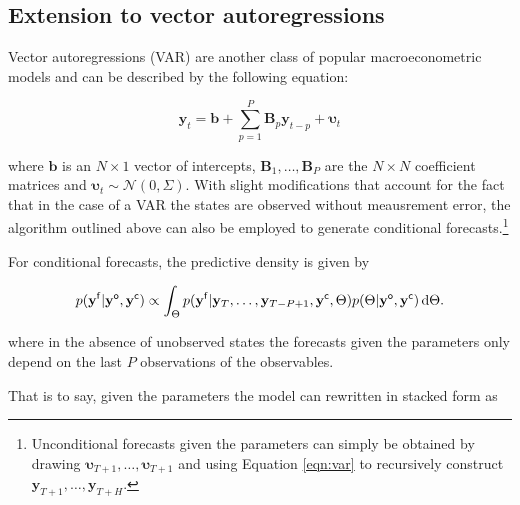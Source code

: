 \documentclass[notitlepage,a4paper,12pt]{article}
\begin{document}
\begin{ThreePartTable}
\pagebreak
\section{Extension to vector autoregressions}

Vector autoregressions (VAR) are another class of popular macroeconometric models and can be described by the following equation: 

\begin{equation}\label{eqn:var}
    \mathbf{y}_t = \mathbf{b} + \sum_{p=1}^P \mathbf{B}_p \mathbf{y}_{t-p} + \boldsymbol{\upsilon}_t
\end{equation}

where $\mathbf{b}$ is an $N \times 1$ vector of intercepts, $\mathbf{B}_1, \dots, \mathbf{B}_P$ are the $N \times N$ coefficient matrices and $\boldsymbol{\upsilon}_t \sim \mathcal{N}(0, \Sigma)$. With slight modifications that account for the fact that in the case of a VAR the states are observed without meausrement error, the algorithm outlined above can also be employed to generate conditional forecasts.\footnote{Unconditional forecasts given the parameters can simply be obtained by drawing $\boldsymbol{\upsilon}_{T+1}, \dots, \boldsymbol{\upsilon}_{T+1}$ and using Equation \ref{eqn:var} to recursively construct $\mathbf{y}_{T+1}, \dots, \mathbf{y}_{T+H}$.}

For conditional forecasts, the predictive density is given by 

\begin{equation}\label{eqn:preddens}    
    p(\mathbf{y^{\sf{f}}}|\mathbf{y^{\sf{o}}}, \mathbf{y^{\sf{c}}}) \propto \int_{\Theta} p(\mathbf{y^{\sf{f}}}|\mathbf{y}_T, \dots, \mathbf{y}_{T-P+1}, \mathbf{y^{\sf{c}}}, \Theta) p(\Theta|\mathbf{y^{\sf{o}}}, \mathbf{y^{\sf{c}}})\, \text{d}\Theta.
\end{equation}

where in the absence of unobserved states the forecasts given the parameters only depend on the last $P$ observations of the observables. 

That is to say, given the parameters the model can rewritten in stacked form as



\end{ThreePartTable}
\end{document}
